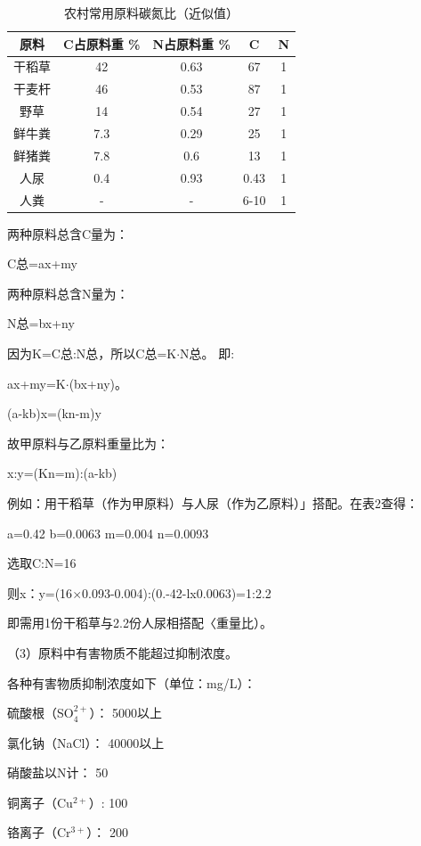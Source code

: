 \documentclass{ctexbook}
\begin{document}
\begin{table}[htbp]
	\centering
	\caption{农村常用原料碳氮比（近似值）}
	\begin{tabular}{c|c|c|c|c}
		\hline
		原料    &  C占原料重 \% & N占原料重 \% & C     & N \\ \hline
		干稻草   & 42    & 0.63  & 67    & 1 \\ \hline
		干麦杆   & 46    & 0.53  & 87    & 1 \\ \hline
		野草    & 14    & 0.54  & 27    & 1 \\ \hline
		鲜牛粪  & 7.3   & 0.29  & 25    & 1 \\ \hline
		鲜猪粪   & 7.8   & 0.6   & 13    & 1 \\ \hline
		人尿    & 0.4   & 0.93  & 0.43  & 1 \\ \hline
		人粪    & -     & -     & 6-10  & 1 \\ 
		\hline
	\end{tabular}%
	\label{tab:tandanbi}%
\end{table}%

两种原料总含C量为：

C总=ax+my

两种原料总含N量为：

N总=bx+ny

因为K=C总:N总，所以C总=K$\cdot$N总。
即:

ax+my=K$\cdot$(bx+ny)。

(a-kb)x=(kn-m)y

故甲原料与乙原料重量比为：

x:y=(Kn=m):(a-kb)

例如：用干稻草（作为甲原料）与人尿（作为乙原料）」搭配。在表2查得：

a=0.42 b=0.0063 m=0.004 n=0.0093

选取C:N=16

则x：y=(16$\times$0.093-0.004):(0.-42-lx0.0063)=1:2.2

即需用1份干稻草与2.2份人尿相搭配〈重量比）。

（3）原料中有害物质不能超过抑制浓度。

各种有害物质抑制浓度如下（单位：mg/L）：

硫酸根（SO$_4^{2+}$）：	5000以上

氯化钠（NaCl）：	40000以上

硝酸盐以N计：	50

铜离子（Cu$^{2+}$）:    100

铬离子（Cr$^{3+}$）：	  200
\end{document}
